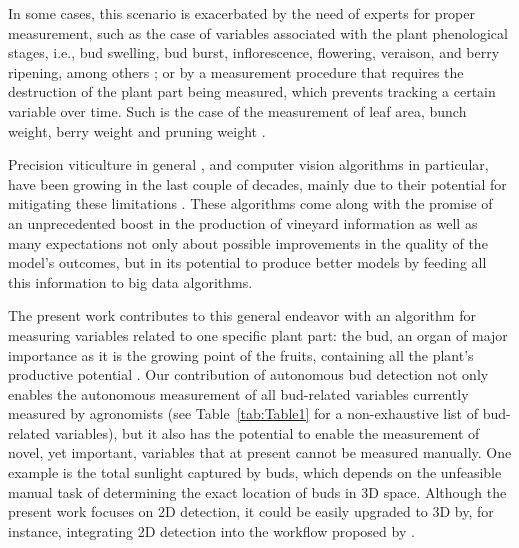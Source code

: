 \documentclass[a4paper,authoryear,review]{elsarticle}
\begin{document}
	In some cases, this scenario is exacerbated by the need of experts for proper measurement, such as the case of variables associated with the plant phenological stages, i.e.,  bud swelling, bud burst, inflorescence, flowering, veraison, and berry ripening, among others \citep{lorenz1995growth}; or by a measurement procedure that requires the destruction of the plant part being measured, which prevents tracking a certain variable over time. Such is the case of the measurement of leaf area, bunch weight, berry weight and pruning weight \citep{kliewer2005leaf}. 
	
	Precision viticulture in general \citep{bramley2009lessons}, and computer vision algorithms in particular, have been growing in the last couple of decades, mainly due to their potential for mitigating these limitations \citep{seng2018computer, matese2015technology}. These algorithms come along with the promise of an unprecedented boost in the production of vineyard information as well as many expectations not only about possible improvements in the quality of the model’s outcomes, but in its potential to produce better models by feeding all this information to big data algorithms. 
	
	The present work contributes to this general endeavor with an algorithm for measuring variables related to one specific plant part: the bud, an organ of major importance as it is the growing point of the fruits, containing all the plant’s productive potential \citep{may2000bud}. Our contribution of autonomous bud detection not only enables the autonomous measurement of all bud-related variables currently measured by agronomists (see Table~\ref{tab:Table1} for a non-exhaustive list of bud-related variables), but it also has the potential to enable the measurement of novel, yet important, variables that at present cannot be measured manually. One example is the total sunlight captured by buds, which depends on the unfeasible manual task of determining the exact location of buds in 3D space.  Although the present work focuses on 2D detection, it could be easily upgraded to 3D by, for instance, integrating 2D detection into the workflow proposed by \citet{diaz2018grapevine} .
	
\end{document}
